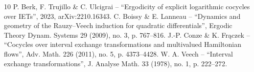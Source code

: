 \begin{thebibliography}{10}
 P. Berk, F. Trujillo \& C. Ulcigrai – “Ergodicity of explicit logarithmic cocycles over IETs”, 2023, arXiv:2210.16343.
 C. Boissy \& E. Lanneau – “Dynamics and geometry of the Rauzy–Veech induction for quadratic differentials”, Ergodic Theory Dynam. Systems 29 (2009), no. 3, p. 767–816.
 J.-P. Conze \& K. Frączek – “Cocycles over interval exchange transformations and multivalued Hamiltonian flows”, Adv. Math. 226 (2011), no. 5, p. 4373–4428.
 W. A. Veech – “Interval exchange transformations”, J. Analyse Math. 33 (1978), no. 1, p. 222–272.
\end{thebibliography}
